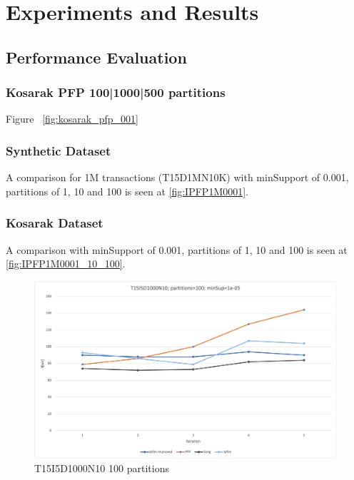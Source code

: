 \section{Experiments and Results}

\subsection{Performance Evaluation}
\subsubsection{Kosarak PFP 100|1000|500 partitions}
Figure ~\autoref{fig:kosarak_pfp_001}
\subsubsection{Synthetic Dataset}
A comparison for 1M transactions (T15D1MN10K) with minSupport of 0.001, partitions of 1, 10 and 100 is seen at \autoref{fig:IPFP1M0001}.

\subsubsection{Kosarak Dataset}
A comparison with minSupport of 0.001, partitions of 1, 10 and 100 is seen at \autoref{fig:IPFP1M0001_10_100}.



\begin{figure}
  \centering
  \includegraphics[width=\linewidth]{figures/4iterations/T15I5D1000N10_100_0005}
  \caption{T15I5D1000N10 100 partitions}
  \label{fig:T15I5D1000N10_100_0005}
\end{figure}

